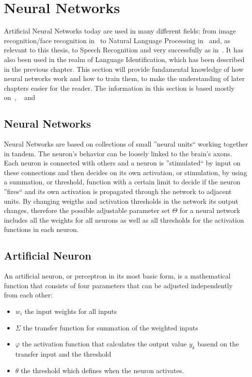 \section{Neural Networks}
\label{sec:fund:NN}
Artificial Neural Networks today are used in many different fields: from image recognition/face recognition in~\cite{lawrence1997face} to Natural Language Processing in~\cite{collobert2008unified} and, as relevant to this thesis, to Speech Recognition and very successfully as in~\cite{hinton2012deep}. It has also been used in the realm of Language Identification, which has been described in the previous chapter. This section will provide fundamental knowledge of how neural networks work and how to train them, to make the understanding of later chapters easier for the reader. The information in this section is based mostly on~\cite{haykin2004comprehensive}, ~\cite{Goodfellow-et-al-2016} and~\cite{deeplearning-online}


\subsection{Neural Networks}
\label{sec:fund:general}
Neural Networks are based on collections of small ''neural units``  working together in tandem. The neuron's behavior can be loosely linked to the brain's axons. Each neuron is connected with others and a neuron is ''stimulated`` by input on these connections and then decides on its own activation, or stimulation, by using a summation, or threshold, function with a certain limit to decide if the neuron ''fires`` and its own activation is propagated through the network to adjacent units. By changing weigths and activation thresholds in the network its output changes, therefore the possible adjustable parameter set \(\Theta\) for a neural network includes all the weights for all neurons as well as all thresholds for the activation functions in each neuron.

\subsection{Artificial Neuron}
\label{sec:fund:AN}

An artificial neuron, or perceptron in its most basic form, is a mathematical function that consists of four parameters that can be adjusted independently from each other:
\begin{itemize}
\item \(w_i\) the input weights for all inputs
\item \(\Sigma\) the transfer function for summation of the weighted inputs
\item \(\varphi\) the activation function that calculates the output value \(y_k\) basend on the transfer input and the threshold
\item \(\theta\) the threshold which defines when the neuron activates.
\end{itemize}

